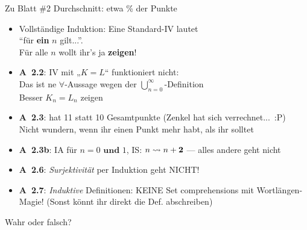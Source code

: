 




\graphicspath{{../figures/}}

\morescalingdelimiters




\begin{frame}{Zu Blatt \#2}
	Durchschnitt: etwa  \% der Punkte 
	\begin{itemize}		
		\item Vollständige Induktion: Eine Standard-IV lautet \\
		{\enquote{für \textbf{\alert{ein}} $n$ gilt...}}.\\
		Für alle $n$ wollt ihr's ja \textbf{zeigen}!
		\item \textbf{A~2.2}: IV mit „$K=L$“ funktioniert nicht: \\ 
		Das ist ne $\forall$-Aussage wegen der $\bigcup\limits^\infty_{n=0}$-Definition \\
		\impl Besser $K_n = L_n$ zeigen
		\item \textbf{A~2.3}: hat 11 statt 10 Gesamtpunkte (Zenkel hat sich verrechnet...~:P) \\
		\impl Nicht wundern, wenn ihr einen Punkt mehr habt, als ihr solltet
		\item \textbf{A~2.3b}: IA für $n=0 \textbf{ und } 1$, \; IS: $n \?> n+\mathbf{2}$ \quad --- alles andere geht nicht
		\item \textbf{A~2.6}: \emph{Surjektivität} per Induktion geht NICHT!
		\item \textbf{A~2.7}: \emph{Induktive} Definitionen: KEINE Set comprehensions mit Wortlängen-Magie! (Sonst könnt ihr direkt die Def. abschreiben)
	\end{itemize}
	
\end{frame}

\framePrevEpisode

\begin{frame}[t]{Wahr oder falsch?}
\end{frame}

